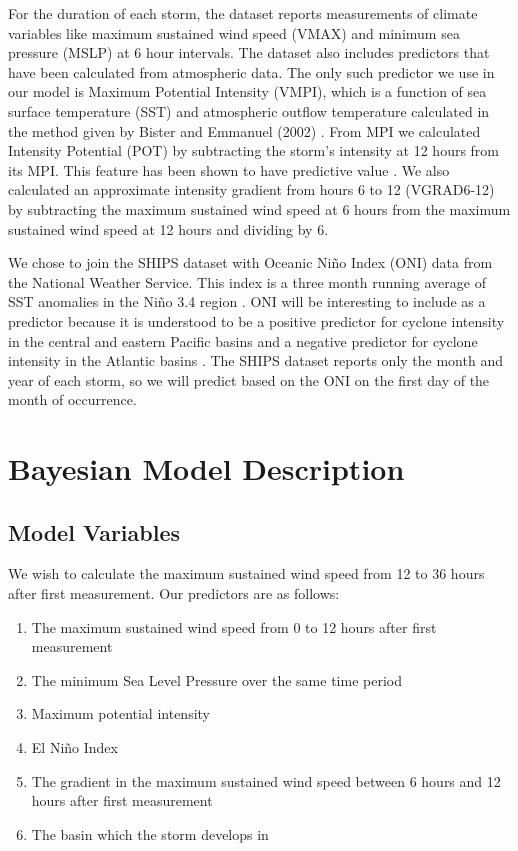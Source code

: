 \documentclass[12pt]{article}
\begin{document}
For the duration of each storm, the dataset reports measurements of climate variables like maximum sustained wind speed (VMAX) and minimum sea pressure (MSLP) at 6 hour intervals. The dataset also includes predictors that have been calculated from atmospheric data. The only such predictor we use in our model is Maximum Potential Intensity (VMPI), which is a function of sea surface temperature (SST) and atmospheric outflow temperature calculated in the method given by Bister and Emmanuel (2002) \cite{bister2002}. From MPI we calculated Intensity Potential (POT) by subtracting the storm’s intensity at 12 hours from its MPI. This feature has been shown to have predictive value \cite{li2018}. We also calculated an approximate intensity gradient from hours 6 to 12 (VGRAD6-12) by subtracting the maximum sustained wind speed at 6 hours from the maximum sustained wind speed at 12 hours and dividing by 6. 

We chose to join the SHIPS dataset with Oceanic Niño Index (ONI) data from the National Weather Service. This index is a three month running average of SST anomalies in the Niño 3.4 region \cite{noaa_oni}. ONI will be interesting to include as a predictor because it is understood to be a positive predictor for cyclone intensity in the central and eastern Pacific basins and a negative predictor for cyclone intensity in the Atlantic basins \cite{bell2014}. The SHIPS dataset reports only the month and year of each storm, so we will predict based on the ONI on the first day of the month of occurrence. 

\section{Bayesian Model Description}

\subsection{Model Variables}
We wish to calculate the maximum sustained wind speed from 12 to 36 hours after first measurement. Our predictors are as follows:
\begin{enumerate}
    \item The maximum sustained wind speed from 0 to 12 hours after first measurement
    \item The minimum Sea Level Pressure over the same time period
    \item Maximum potential intensity 
    \item El Niño Index
    \item The gradient in the maximum sustained wind speed between 6 hours and 12 hours after first measurement
    \item The basin which the storm develops in
    \end{enumerate}
\end{document}
